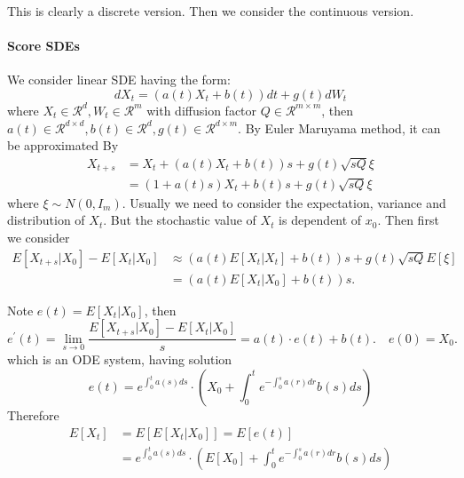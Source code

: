 This is clearly a discrete version. Then we consider the continuous version.
\paragraph{Score SDEs}
We consider linear SDE having the form:
\begin{equation}
    dX_t = (a(t)X_t + b(t))dt + g(t)dW_t
\end{equation}
where $X_t\in \mathcal{R}^d, W_t\in \mathcal{R}^m$ with diffusion factor $Q\in \mathcal{R}^{m\times m}$, then $a(t)\in \mathcal{R}^{d\times d}, b(t)\in \mathcal{R}^d, g(t)\in \mathcal{R}^{d\times m}$. 
By Euler Maruyama method, it can be approximated By
\begin{equation}
    \begin{aligned}
        X_{t+s}&=X_t + (a(t)X_t + b(t))s+g(t)\sqrt{sQ}\xi\\
        &=(1+a(t)s)X_t + b(t)s + g(t)\sqrt{sQ}\xi
    \end{aligned}
\end{equation}
where $\xi\sim N(0, I_m)$. Usually we need to consider the expectation, variance and distribution of $X_t$. But the stochastic value of $X_t$ is dependent of $x_0$. Then first we consider
\begin{equation}
    \begin{aligned}
    E\left[X_{t+s} | X_{0}\right]-E\left[X_{t} | X_{0}\right] & \approx\left(a(t) E\left[X_{t} | X_{t}\right]+b(t)\right) s+g(t) \sqrt{sQ} E[\xi] \\
    & =\left(a(t) E\left[X_{t} | X_{0}\right]+b(t)\right) s .
    \end{aligned}
\end{equation}


Note  $e(t)=E\left[X_{t} | X_{0}\right]$, then
\begin{equation}
    e^{\prime}(t)=\lim _{s \rightarrow 0} \frac{E\left[X_{t+s} | X_{0}\right]-E\left[X_{t} | X_{0}\right]}{s}=a(t) \cdot e(t)+b(t) . \quad e(0)=X_{0} .    
\end{equation}
which is an ODE system, having solution
\begin{equation}
    e(t)=e^{\int_{0}^{t} a(s) d s}\cdot\left(X_{0}+\int_{0}^{t} e^{-\int_{0}^{s} a(r) d r} b(s) d s\right)
\end{equation}
Therefore
\begin{equation}
    \begin{aligned}
    E\left[X_{t}\right] & =E\left[E\left[X_{t} | X_{0}\right]\right]=E[e(t)] \\
    & =e^{\int_{0}^{t} a(s) d s}\cdot\left(E\left[X_{0}\right]+\int_{0}^{t} e^{-\int_{0}^{s} a(r) d r} b(s) d s\right) 
    \end{aligned}
\end{equation}

